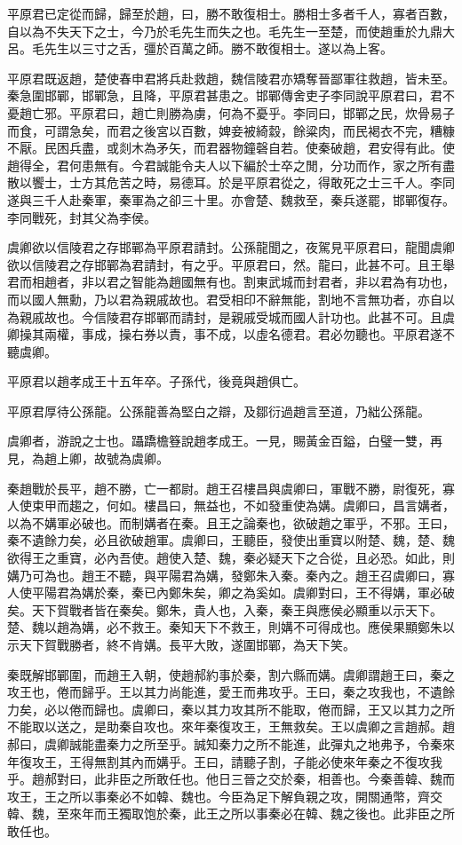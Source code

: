 平原君已定從而歸，歸至於趙，曰，勝不敢復相士。勝相士多者千人，寡者百數，自以為不失天下之士，今乃於毛先生而失之也。毛先生一至楚，而使趙重於九鼎大呂。毛先生以三寸之舌，彊於百萬之師。勝不敢復相士。遂以為上客。

平原君既返趙，楚使春申君將兵赴救趙，魏信陵君亦矯奪晉鄙軍往救趙，皆未至。秦急圍邯鄲，邯鄲急，且降，平原君甚患之。邯鄲傳舍吏子李同說平原君曰，君不憂趙亡邪。平原君曰，趙亡則勝為虜，何為不憂乎。李同曰，邯鄲之民，炊骨易子而食，可謂急矣，而君之後宮以百數，婢妾被綺縠，餘粱肉，而民褐衣不完，糟糠不厭。民困兵盡，或剡木為矛矢，而君器物鐘磬自若。使秦破趙，君安得有此。使趙得全，君何患無有。今君誠能令夫人以下編於士卒之閒，分功而作，家之所有盡散以饗士，士方其危苦之時，易德耳。於是平原君從之，得敢死之士三千人。李同遂與三千人赴秦軍，秦軍為之卻三十里。亦會楚、魏救至，秦兵遂罷，邯鄲復存。李同戰死，封其父為李侯。

虞卿欲以信陵君之存邯鄲為平原君請封。公孫龍聞之，夜駕見平原君曰，龍聞虞卿欲以信陵君之存邯鄲為君請封，有之乎。平原君曰，然。龍曰，此甚不可。且王舉君而相趙者，非以君之智能為趙國無有也。割東武城而封君者，非以君為有功也，而以國人無勳，乃以君為親戚故也。君受相印不辭無能，割地不言無功者，亦自以為親戚故也。今信陵君存邯鄲而請封，是親戚受城而國人計功也。此甚不可。且虞卿操其兩權，事成，操右券以責，事不成，以虛名德君。君必勿聽也。平原君遂不聽虞卿。

平原君以趙孝成王十五年卒。子孫代，後竟與趙俱亡。

平原君厚待公孫龍。公孫龍善為堅白之辯，及鄒衍過趙言至道，乃絀公孫龍。

虞卿者，游說之士也。躡蹻檐簦說趙孝成王。一見，賜黃金百鎰，白璧一雙，再見，為趙上卿，故號為虞卿。

秦趙戰於長平，趙不勝，亡一都尉。趙王召樓昌與虞卿曰，軍戰不勝，尉復死，寡人使束甲而趨之，何如。樓昌曰，無益也，不如發重使為媾。虞卿曰，昌言媾者，以為不媾軍必破也。而制媾者在秦。且王之論秦也，欲破趙之軍乎，不邪。王曰，秦不遺餘力矣，必且欲破趙軍。虞卿曰，王聽臣，發使出重寶以附楚、魏，楚、魏欲得王之重寶，必內吾使。趙使入楚、魏，秦必疑天下之合從，且必恐。如此，則媾乃可為也。趙王不聽，與平陽君為媾，發鄭朱入秦。秦內之。趙王召虞卿曰，寡人使平陽君為媾於秦，秦已內鄭朱矣，卿之為奚如。虞卿對曰，王不得媾，軍必破矣。天下賀戰者皆在秦矣。鄭朱，貴人也，入秦，秦王與應侯必顯重以示天下。楚、魏以趙為媾，必不救王。秦知天下不救王，則媾不可得成也。應侯果顯鄭朱以示天下賀戰勝者，終不肯媾。長平大敗，遂圍邯鄲，為天下笑。

秦既解邯鄲圍，而趙王入朝，使趙郝約事於秦，割六縣而媾。虞卿謂趙王曰，秦之攻王也，倦而歸乎。王以其力尚能進，愛王而弗攻乎。王曰，秦之攻我也，不遺餘力矣，必以倦而歸也。虞卿曰，秦以其力攻其所不能取，倦而歸，王又以其力之所不能取以送之，是助秦自攻也。來年秦復攻王，王無救矣。王以虞卿之言趙郝。趙郝曰，虞卿誠能盡秦力之所至乎。誠知秦力之所不能進，此彈丸之地弗予，令秦來年復攻王，王得無割其內而媾乎。王曰，請聽子割，子能必使來年秦之不復攻我乎。趙郝對曰，此非臣之所敢任也。他日三晉之交於秦，相善也。今秦善韓、魏而攻王，王之所以事秦必不如韓、魏也。今臣為足下解負親之攻，開關通幣，齊交韓、魏，至來年而王獨取饱於秦，此王之所以事秦必在韓、魏之後也。此非臣之所敢任也。

